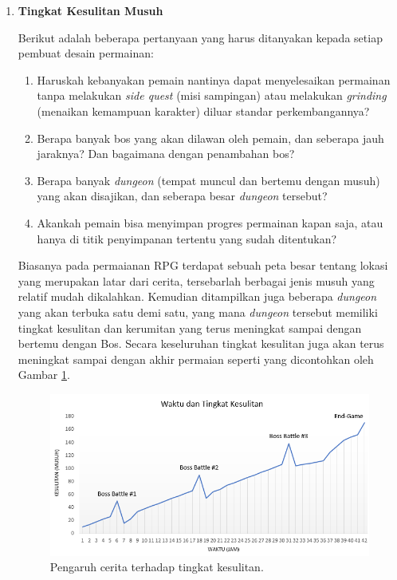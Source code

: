 \begin{subs}
	\begin{enumerate}[label=\textbf{\arabic*).}]
		
		\item \textbf{Tingkat Kesulitan Musuh}
		\setlength{\parindent}{0.8cm}
	
		Berikut adalah beberapa pertanyaan yang harus ditanyakan kepada setiap pembuat desain permainan:
		
		\begin{enumerate}[label=\alph*).]
			\item Haruskah kebanyakan pemain nantinya dapat menyelesaikan permainan tanpa melakukan \textit{side quest} (misi sampingan) atau melakukan \textit{grinding} (menaikan kemampuan karakter) diluar standar perkembangannya?
			\item Berapa banyak bos yang akan dilawan oleh pemain, dan seberapa jauh jaraknya? Dan bagaimana dengan penambahan bos?
			\item Berapa banyak \textit{dungeon} (tempat muncul dan bertemu dengan musuh) yang akan disajikan, dan seberapa besar \textit{dungeon} tersebut?
			\item Akankah pemain bisa menyimpan progres permainan kapan saja, atau hanya di titik penyimpanan tertentu yang sudah ditentukan?
		\end{enumerate}
		\vspace{1ex}
	
		Biasanya pada permaianan RPG terdapat sebuah peta besar tentang lokasi yang merupakan latar dari cerita, tersebarlah berbagai jenis musuh yang relatif mudah dikalahkan. Kemudian ditampilkan juga beberapa \textit{dungeon} yang akan terbuka satu demi satu, yang mana \textit{dungeon} tersebut memiliki tingkat kesulitan dan kerumitan yang terus meningkat sampai dengan bertemu dengan Bos. Secara keseluruhan tingkat kesulitan juga akan terus meningkat sampai dengan akhir permaian seperti yang dicontohkan oleh Gambar \ref{fig:story_dungeon}.
		
		\begin{figure} [!h] \centering
			\includegraphics[scale=0.7]{img/story_dungeon.png}
			\caption{Pengaruh cerita terhadap tingkat kesulitan.}
			\label{fig:story_dungeon}
		\end{figure}
		

\end{enumerate}
\end{subs}
